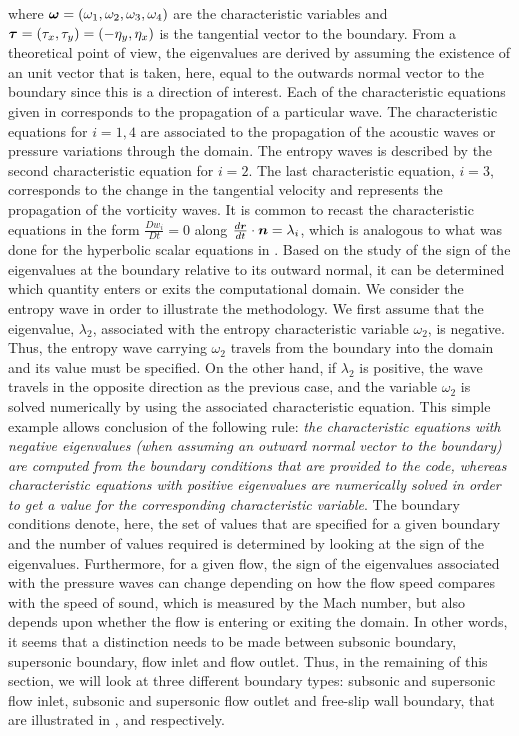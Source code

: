 %
where $\boldsymbol\omega = \left( \omega_1, \omega_2, \omega_3, \omega_4 \right)$ are the characteristic variables and $\boldsymbol\tau = \left( \tau_x, \tau_y \right) = \left( -\eta_y, \eta_x \right)$ is the tangential vector to the boundary. From a theoretical point of view, the eigenvalues are derived by assuming the existence of an unit vector that is taken, here, equal to the outwards normal vector to the boundary since this is a direction of interest. Each of the characteristic equations given in  corresponds to the propagation of a particular wave. The characteristic equations for $i=1,4$ are associated to the propagation of the acoustic waves or pressure variations through the domain. The entropy waves is described by the second characteristic equation for $i=2$. The last characteristic equation, $i=3$, corresponds to the change in the tangential velocity and represents the propagation of the vorticity waves. It is common to recast the characteristic equations in the form $\frac{D w_i}{Dt} = 0$ along $\frac{d\boldsymbol r}{dt} \cdot \boldsymbol n = \lambda_i$, which is analogous to what was done for the hyperbolic scalar equations in . Based on the study of the sign of the eigenvalues at the boundary relative to its outward normal, it can be determined which quantity enters or exits the computational domain. We consider the entropy wave in order to illustrate the methodology. We first assume that the eigenvalue, $\lambda_2$, associated with the entropy characteristic variable $\omega_2$, is negative. Thus, the entropy wave carrying $\omega_2$ travels from the boundary into the domain and its value must be specified. On the other hand, if $\lambda_2$ is positive, the wave travels in the opposite direction as the previous case, and the variable $\omega_2$ is solved numerically by using the associated characteristic equation. This simple example allows conclusion of the following rule: \emph{the characteristic equations with negative eigenvalues (when assuming an outward normal vector to the boundary) are computed from the boundary conditions that are provided to the code, whereas characteristic equations with positive eigenvalues are numerically solved in order to get a value for the corresponding characteristic variable}. The boundary conditions denote, here, the set of values that are specified for a given boundary and the number of values required is determined by looking at the sign of the eigenvalues. Furthermore, for a given flow, the sign of the eigenvalues associated with the pressure waves can change depending on how the flow speed compares with the speed of sound, which is measured by the Mach number, but also depends upon whether the flow is entering or exiting the domain. In other words, it seems that a distinction needs to be made between subsonic boundary, supersonic boundary, flow inlet and flow outlet. Thus, in the remaining of this section, we will look at three different boundary types: subsonic and supersonic flow inlet, subsonic and supersonic flow outlet and free-slip wall boundary, that are illustrated in ,  and  respectively.  
